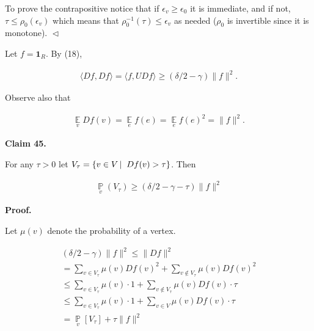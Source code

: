 \documentclass[10pt,a4paper]{article}
\begin{document}
To prove the contrapositive notice that if $\epsilon_{v}\geq\epsilon_{0}$ it is immediate, and if not, $\tau\leq\rho_{0}(\epsilon_{v})$ which means that $\rho_{0}^{-1}(\tau)\leq\epsilon_{v}$ as needed ($\rho_{0}$ is invertible since it is monotone).
$\vartriangleleft$\par




Let $f={\mathbf{1}}_{R}$. By (18),\par


\[\begin{gathered}
\langle Df,Df\rangle=\langle f,UDf\rangle\geq(\delta/2-\gamma)\lVert f\rVert^{2}.
\end{gathered}\]


Observe also that\par


\[\begin{gathered}
\operatorname*{\mathbb{E}}_{v}Df(v)=\operatorname*{\mathbb{E}}_{e}f(e)=\operatorname*{\mathbb{E}}_{e}f(e)^{2}=\lVert f\rVert^{2}.
\end{gathered}\]





\par\medskip\noindent\textbf{
Claim 45. 
}\par



For any $\tau>0$ let $V_{\tau}=\left\{v\in V\left|\;\vphantom{v\in VDf(v)>\tau}\right.Df(v)>\tau\right\}$. Then\par


\[\begin{gathered}
\operatorname*{\mathbb{P}}_{v}(V_{\tau})\geq(\delta/2-\gamma-\tau)\lVert f\rVert^{2}
\end{gathered}\]







\par\medskip\noindent\textbf{
\textbf{Proof}.}\par




Let $\mu(v)$ denote the probability of a vertex.\par


\[\begin{gathered}
\displaystyle(\delta/2-\gamma)\lVert f\rVert^{2} \displaystyle\leq\lVert Df\rVert^{2} \\
\displaystyle=\sum_{v\in V_{\tau}}\mu(v)Df(v)^{2}+\sum_{v\not\in V_{\tau}}\mu(v)Df(v)^{2} \\
\displaystyle\leq\sum_{v\in V_{\tau}}\mu(v)\cdot 1+\sum_{v\not\in V_{\tau}}\mu(v)Df(v)\cdot\tau \\
\displaystyle\leq\sum_{v\in V_{\tau}}\mu(v)\cdot 1+\sum_{v\in V}\mu(v)Df(v)\cdot\tau \\
\displaystyle=\operatorname*{\mathbb{P}}_{v}[V_{\tau}]+\tau\lVert f\rVert^{2}
\end{gathered}\]
\end{document}
